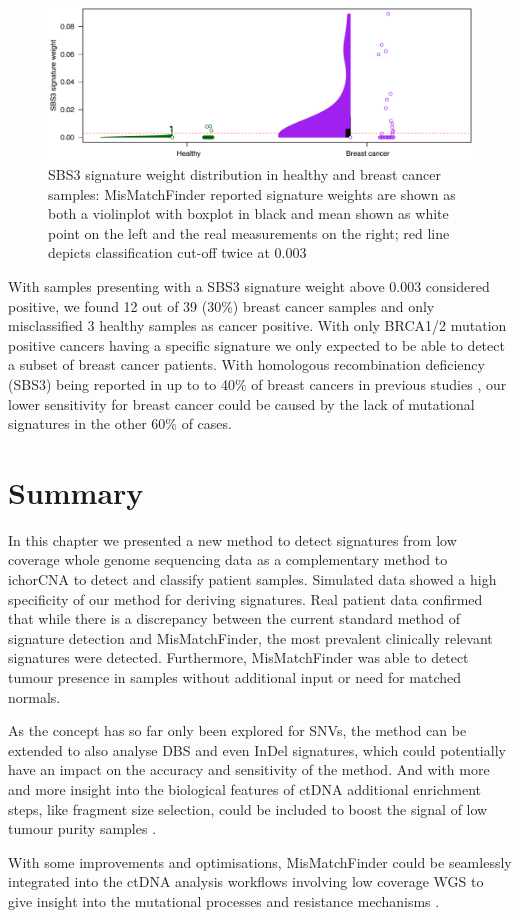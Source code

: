 \begin{figure}[ht]
\centering
\includegraphics[width=.99\linewidth]{Figures/MisMatchFinder/SBS3Distributions.pdf}
\caption[SBS3 signature weight distribution in healthy and breast cancer samples]{SBS3 signature weight distribution in healthy and breast cancer samples: MisMatchFinder reported signature weights are shown as both a violinplot with boxplot in black and mean shown as white point on the left and the real measurements on the right; red line depicts classification cut-off twice at 0.003}\label{fig:mmf-SBS3distribution}
\end{figure}

With samples presenting with a SBS3 signature weight above 0.003 considered positive, we found 12 out of 39 (30\%) breast cancer samples and only misclassified 3 healthy samples as cancer positive. With only BRCA1/2 mutation positive cancers having a specific signature we only expected to be able to detect a subset of breast cancer patients. With homologous recombination deficiency (SBS3) being reported in up to to 40\% of breast cancers in previous studies \cite{AkashiTanaka2015}, our lower sensitivity for breast cancer could be caused by the lack of mutational signatures in the other 60\% of cases.

\section{Summary}
In this chapter we presented a new method to detect signatures from low coverage whole genome sequencing data as a complementary method to ichorCNA to detect and classify patient samples. Simulated data showed a high specificity of our method for deriving signatures. Real patient data confirmed that while there is a discrepancy between the current standard method of signature detection and MisMatchFinder, the most prevalent clinically relevant signatures were detected. Furthermore, MisMatchFinder was able to detect tumour presence in samples without additional input or need for matched normals.

As the concept has so far only been explored for SNVs, the method can be extended to also analyse DBS and even InDel signatures, which could potentially have an impact on the accuracy and sensitivity of the method.
And with more and more insight into the biological features of ctDNA additional enrichment steps, like fragment size selection, could be included to boost the signal of low tumour purity samples \cite{Mouliere2018,Markus2022}.

With some improvements and optimisations, MisMatchFinder could be seamlessly integrated into the ctDNA analysis workflows involving low coverage WGS to give insight into the mutational processes and resistance mechanisms \cite{Homburger2019,Chen2021}.
